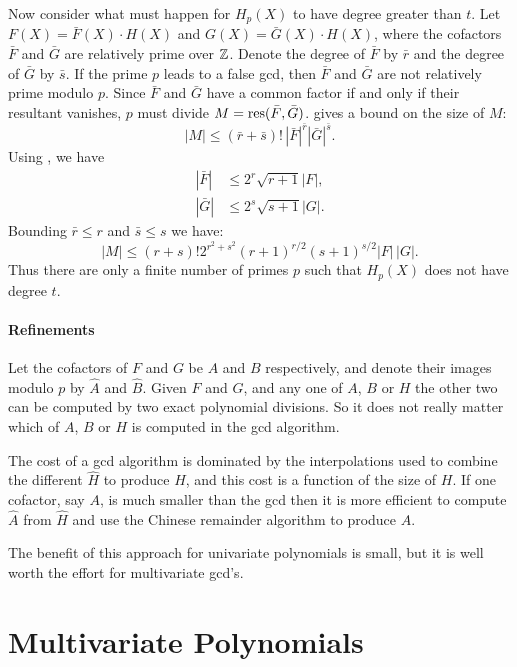 \smallskip
Now consider what must happen for $H_p(X)$ to have degree greater than
$t$.  Let $F(X) = \bar{F}(X) \cdot H(X)$ and $G(X) = \bar{G}(X) \cdot
H(X)$, where the cofactors $\bar{F}$ and $\bar{G}$ are relatively prime
over $\mathbb{Z}$.  Denote the degree of $\bar{F}$ by $\bar{r}$ and the degree
of $\bar{G}$ by $\bar{s}$.  If the prime $p$ leads to a false {\sc gcd},
then $\bar{F}$ and $\bar{G}$ are not relatively prime modulo $p$.
Since $\bar{F}$ and $\bar{G}$ have a common factor if and only if
their resultant vanishes, $p$ must divide $M = \mathop{\rm res}\nolimits (\bar{F},
\bar{G})$.   gives a bound on the
size of $M$: 
\[
|M| \le (\bar{r} + \bar{s})!\, |\bar{F}|^{\bar{r}} |\bar{G}|^{\bar{s}}.
\]
Using , we have
\[
\begin{aligned}
|\bar{F}| & \le 2^r \sqrt{r+1} |F|, \\
|\bar{G}| & \le 2^s \sqrt{s+1} |G|.
\end{aligned}
\]
Bounding $\bar{r} \le r$ and $\bar{s} \le s$ we have:
\[
|M| \le (r+s)! 2^{r^2+s^2} (r+1)^{r/2} (s+1)^{s/2} |F| \, |G|.
\]
Thus there are only a finite number of primes $p$ such that $H_p(X)$
does not have degree $t$.

\paragraph{Refinements}

Let the cofactors of $F$ and $G$ be $A$ and $B$ respectively, and
denote their images modulo $p$ by $\hat{A}$ and $\hat{B}$.  Given $F$
and $G$, and any one of $A$, $B$ or $H$ the other two can be computed
by two exact polynomial divisions.  So it does not really matter which
of $A$, $B$ or $H$ is computed in the {\sc gcd} algorithm.

The cost of a {\sc gcd} algorithm is dominated by the interpolations
used to combine the different $\hat{H}$ to produce $H$, and this cost
is a function of the size of $H$.  If one cofactor, say $A$, is much
smaller than the {\sc gcd} then it is more efficient to compute
$\hat{A}$ from $\hat{H}$ and use the Chinese remainder
algorithm to produce
$A$.

The benefit of this approach for univariate polynomials is small, but
it is well worth the effort for multivariate {\sc gcd}'s.

\section{Multivariate Polynomials}
\label{PGCD:Multi:Sec}

